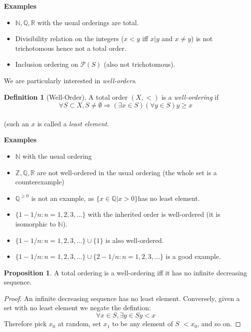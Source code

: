 \documentclass{article}
\theoremstyle{definition}
\newtheorem{definition}{Definition}
\newtheorem{proposition}{Proposition}
\numberwithin{definition}{section}
\begin{document}
\textbf{Examples}
\begin{itemize}
\item $\mathbb{N}, \mathbb{Q}, \mathbb{R}$ with the usual orderings are total.
\item Divisibility relation on the integers ($x < y$ iff $x|y$ and $x \ne y$) is not trichotomous hence not a total order. 
\item Inclusion ordering on $\mathcal{P}(S)$ (also not trichotomous).
\end{itemize}
We are particularly interested in \textit{well-orders}. 
\begin{definition}[Well-Order]
A total order $(X,<)$ is a \textit{well-ordering} if 
$$\forall S \subset X, S \ne \emptyset \Rightarrow (\exists x \in S) (\forall y \in S) y \ge x$$\\
(such an $x$ is called a \textit{least element}. 
\end{definition}

\textbf{Examples}
\begin{itemize}
\item $\mathbb{N}$ with the usual ordering
\item $\mathbb{Z},\mathbb{Q},\mathbb{R}$ are not well-ordered in the usual ordering (the whole set is a counterexample)
\item $\mathbb{Q}^{\ge 0}$ is not an example, as $\{x \in \mathbb{Q} | x >0 \} $has no least element.
\item $\{1 - 1/n : n = 1,2,3,\ldots \}$ with the inherited order is well-ordered (it is isomorphic to $\mathbb{N}$). 
\item $\{1 - 1/n : n = 1,2,3,\ldots \}\cup \{1\}$ is also well-ordered.
\item $\{1 - 1/n : n = 1,2,3,\ldots \} \cup \{2-1/n : n=1,2,3,\ldots\}$ is a good example.
\end{itemize}

\begin{proposition} 
	A total ordering is a well-ordering iff it has no infinite decreasing sequence.
\end{proposition}
\begin{proof}
An infinite decreasing sequence has no least element. Conversely, given a set with no least element we negate the defintion:
$$\forall x \in S, \exists y \in S y <x$$
Therefore pick $x_{0}$ at random, set $x_{1}$ to be any element of $S$ $<x_{0}$, and so on. 
\end{proof}
\end{document}
